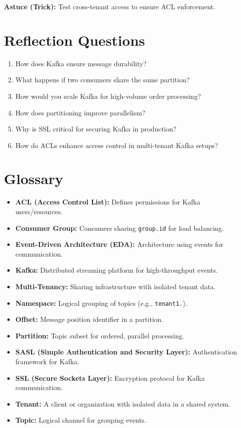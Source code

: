 \documentclass[12pt,a4paper]{report}
\begin{document}
\begin{framed}
\textbf{Astuce (Trick):} Test cross-tenant access to ensure ACL enforcement.
\end{framed}

\chapter*{Reflection Questions}
\begin{enumerate}
    \item How does Kafka ensure message durability?  
    \item What happens if two consumers share the same partition?  
    \item How would you scale Kafka for high-volume order processing?  
    \item How does partitioning improve parallelism?  
    \item Why is SSL critical for securing Kafka in production?  
    \item How do ACLs enhance access control in multi-tenant Kafka setups?
\end{enumerate}

\chapter*{Glossary}
\begin{itemize}
    \item \textbf{ACL (Access Control List):} Defines permissions for Kafka users/resources.
    \item \textbf{Consumer Group:} Consumers sharing \texttt{group.id} for load balancing.
    \item \textbf{Event-Driven Architecture (EDA):} Architecture using events for communication.
    \item \textbf{Kafka:} Distributed streaming platform for high-throughput events.
    \item \textbf{Multi-Tenancy:} Sharing infrastructure with isolated tenant data.
    \item \textbf{Namespace:} Logical grouping of topics (e.g., \texttt{tenant1.}).
    \item \textbf{Offset:} Message position identifier in a partition.
    \item \textbf{Partition:} Topic subset for ordered, parallel processing.
    \item \textbf{SASL (Simple Authentication and Security Layer):} Authentication framework for Kafka.
    \item \textbf{SSL (Secure Sockets Layer):} Encryption protocol for Kafka communication.
    \item \textbf{Tenant:} A client or organization with isolated data in a shared system.
    \item \textbf{Topic:} Logical channel for grouping events.
\end{itemize}
\end{document}
